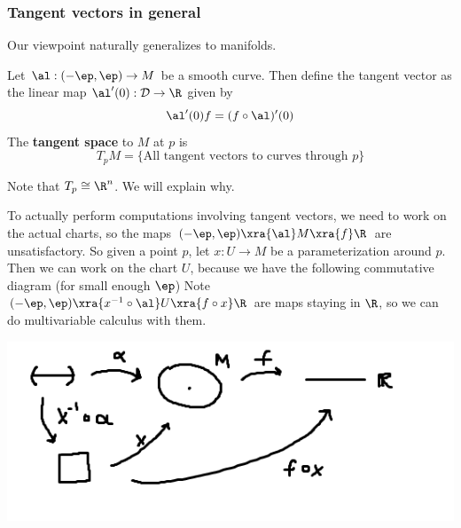 %
%



\subsubsection{Tangent vectors in general}
Our viewpoint naturally generalizes to manifolds.
\begin{df}
Let $\al:(-\ep,\ep)\to M$ be a smooth curve. Then define the tangent vector as the linear map $\al'(0):\cal D\to \R$ given by
\[
\al'(0)f=(f\circ \al)'(0)
\]
The \textbf{tangent space} to $M$ at $p$ is
\[
T_pM=\{\text{All tangent vectors to curves through }p\}
\]
\end{df}
Note that $T_p\cong \R^n$. We will explain why.

To actually perform computations involving tangent vectors, we need to work on the actual charts, so the maps $(-\ep,\ep)\xra{\al} M \xra{f} \R$ are unsatisfactory. So given a point $p$, let
$x:U\to M$ be a parameterization around $p$. Then we can work on the chart $U$, because we have the following commutative diagram (for small enough $\ep$)
\eeq 
Note $(-\ep,\ep)\xra{x^{-1}\circ \al}U\xra{f\circ x}\R$ are maps staying in $\R$, so we can do multivariable calculus with them.

\begin{center}
\includegraphics{1-3}
\end{center}


